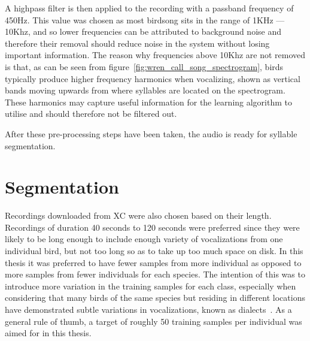 A highpass filter is then applied to the recording with a passband frequency of
450Hz. This value was chosen as most birdsong sits in the range of 1KHz ---
10Khz, and so lower frequencies can be attributed to background noise and
therefore their removal should reduce noise in the system without losing
important information. The reason why frequencies above 10Khz are not removed
is that, as can be seen from figure~\ref{fig:wren_call_song_spectrogram}, birds
typically produce higher frequency harmonics when vocalizing, shown as vertical
bands moving upwards from where syllables are located on the spectrogram. These
harmonics may capture useful information for the learning algorithm to utilise
and should therefore not be filtered out.

After these pre-processing steps have been taken, the audio is ready for
syllable segmentation.

\section{Segmentation}\label{sec:segmentation}

Recordings downloaded from XC were also chosen based on their length. Recordings
of duration 40 seconds to 120 seconds were preferred since they were likely to
be long enough to include enough variety of vocalizations from one individual
bird, but not too long so as to take up too much space on disk. In this thesis
it was preferred to have fewer samples from more individual as opposed to more
samples from fewer individuals for each species. The intention of this was to
introduce more variation in the training samples for each class, especially when
considering that many birds of the same species but residing in different
locations have demonstrated subtle variations in vocalizations, known as
dialects~\cite{baker1985biology}. As a general rule of thumb, a target of
roughly 50 training samples per individual was aimed for in this thesis.

